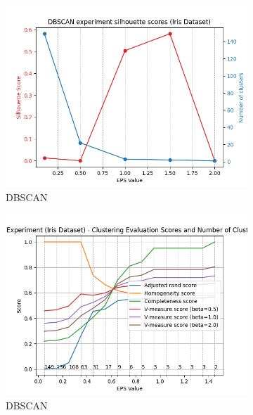 \documentclass[12pt]{article}
\begin{document}
\begin{figure}[H]
\begin{subfigure}[t]{0.19\textwidth}
        \includegraphics[width=\linewidth]{img/other_datasets/iris_dbscan_silhouette.png}
        \caption{DBSCAN}
    \end{subfigure}
    \hfill
    \begin{subfigure}[t]{0.19\textwidth}
        \includegraphics[width=\linewidth]{img/other_datasets/iris_dbscan_scores.png}
        \caption{DBSCAN}
    \end{subfigure}
    \begin{subfigure}[t]{0.19\textwidth}

\end{subfigure}
\end{figure}
\end{document}
